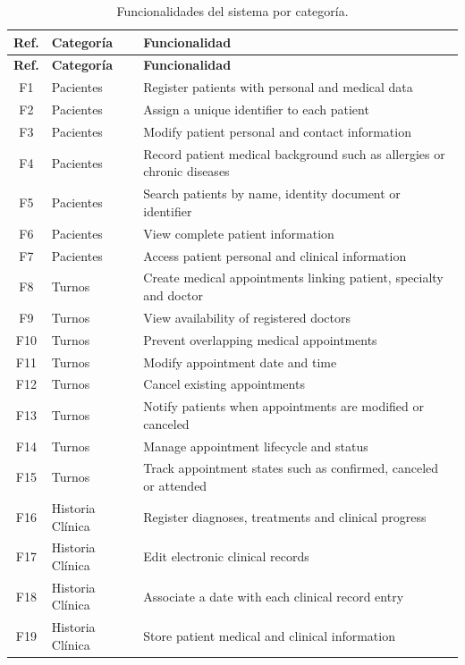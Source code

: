 \documentclass{prgrado}
\begin{document}
\begin{longtable}{|c|l|p{9cm}|}
\caption{Funcionalidades del sistema por categoría.}
\label{tab:funcionalidades} \\
\hline
\textbf{Ref.} & \textbf{Categoría} & \textbf{Funcionalidad} \\
\hline
\endfirsthead
\hline
\textbf{Ref.} & \textbf{Categoría} & \textbf{Funcionalidad} \\
\hline
\endhead

F1 & Pacientes & Register patients with personal and medical data \\ \hline
F2 & Pacientes & Assign a unique identifier to each patient \\ \hline
F3 & Pacientes & Modify patient personal and contact information \\ \hline
F4 & Pacientes & Record patient medical background such as allergies or chronic diseases \\ \hline
F5 & Pacientes & Search patients by name, identity document or identifier \\ \hline
F6 & Pacientes & View complete patient information \\ \hline
F7 & Pacientes & Access patient personal and clinical information \\ \hline
F8 & Turnos & Create medical appointments linking patient, specialty and doctor \\ \hline
F9 & Turnos & View availability of registered doctors \\ \hline
F10 & Turnos & Prevent overlapping medical appointments \\ \hline
F11 & Turnos & Modify appointment date and time \\ \hline
F12 & Turnos & Cancel existing appointments \\ \hline
F13 & Turnos & Notify patients when appointments are modified or canceled \\ \hline
F14 & Turnos & Manage appointment lifecycle and status \\ \hline
F15 & Turnos & Track appointment states such as confirmed, canceled or attended \\ \hline
F16 & Historia Clínica & Register diagnoses, treatments and clinical progress \\ \hline
F17 & Historia Clínica & Edit electronic clinical records \\ \hline
F18 & Historia Clínica & Associate a date with each clinical record entry \\ \hline
F19 & Historia Clínica & Store patient medical and clinical information \\ \hline

\end{longtable}
\end{document}
